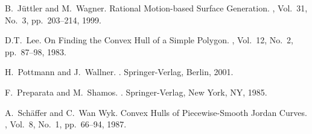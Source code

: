 \documentclass[11pt]{article}          %
\begin{document}
\begin{thebibliography}{99}

B.~J\"uttler and M.~Wagner.
\newblock Rational Motion-based Surface Generation.
,
Vol.~31, No.~3, pp.~203--214, 1999.

D.T.~Lee.
\newblock On Finding the Convex Hull of a Simple Polygon.
,
Vol.~12, No.~2, pp.~87--98, 1983.

H.~Pottmann and J.~Wallner.
.
\newblock Springer-Verlag, Berlin, 2001.

F.~Preparata and M.~Shamos.
.
\newblock Springer-Verlag, New York, NY, 1985.

A.~Sch\"affer and C.~Wan Wyk.
\newblock Convex Hulls of Piecewise-Smooth Jordan Curves.
, Vol.~8, No.~1, pp.~66--94, 1987.

\end{thebibliography}

\end{document}
